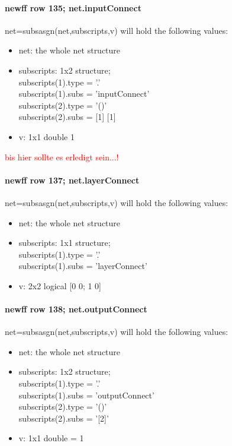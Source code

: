\paragraph{newff row 135; net.inputConnect} net=subsasgn(net,subscripts,v) will hold the following values:
\begin{itemize}
	\item net: the whole net structure
	\item subscripts: 1x2 structure;\\
		subscripts(1).type = '.'\\
		subscripts(1).subs = 'inputConnect'\\
		subscripts(2).type = '()'\\
		subscripts(2).subs = [1] [1]
	\item v: 1x1 double 1
\end{itemize}
\textcolor{red}{bis hier sollte es erledigt sein...!}

\paragraph{newff row 137; net.layerConnect} net=subsasgn(net,subscripts,v) will hold the following values:
\begin{itemize}
	\item net: the whole net structure
	\item subscripts: 1x1 structure;\\
		subscripts(1).type = '.'\\
		subscripts(1).subs = 'layerConnect'
	\item v: 2x2 logical [0 0; 1 0]
\end{itemize}

\paragraph{newff row 138; net.outputConnect} net=subsasgn(net,subscripts,v) will hold the following values:
\begin{itemize}
	\item net: the whole net structure
	\item subscripts: 1x2 structure;\\
		subscripts(1).type = '.'\\
		subscripts(1).subs = 'outputConnect'\\
		subscripts(2).type = '()'\\
		subscripts(2).subs = '[2]'
	\item v: 1x1 double = 1
\end{itemize}

